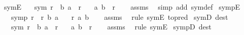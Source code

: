 \begin{isabellebody}
\ symE{\isacharcolon}{\kern0pt}\isanewline
\ \ \ {\isachardoublequoteopen}sym\ r{\isachardoublequoteclose}\ \ {\isachardoublequoteopen}{\isacharparenleft}{\kern0pt}b{\isacharcomma}{\kern0pt}\ a{\isacharparenright}{\kern0pt}\ {\isasymin}\ r{\isachardoublequoteclose}\isanewline
\ \ \ {\isachardoublequoteopen}{\isacharparenleft}{\kern0pt}a{\isacharcomma}{\kern0pt}\ b{\isacharparenright}{\kern0pt}\ {\isasymin}\ r{\isachardoublequoteclose}\isanewline
%
\isadelimproof
\ \ %
\endisadelimproof
%
\isatagproof
{}\isamarkupfalse%
\ assms\ \isamarkupfalse%
\ {\isacharparenleft}{\kern0pt}simp\ add{\isacharcolon}{\kern0pt}\ sym{\isacharunderscore}{\kern0pt}def{\isacharparenright}{\kern0pt}%
\endisatagproof
{\isafoldproof}%
%
\isadelimproof
\isanewline
%
\endisadelimproof
\isanewline
{}\isamarkupfalse%
\ sympE{\isacharcolon}{\kern0pt}\isanewline
\ \ \ {\isachardoublequoteopen}symp\ r{\isachardoublequoteclose}\ \ {\isachardoublequoteopen}r\ b\ a{\isachardoublequoteclose}\isanewline
\ \ \ {\isachardoublequoteopen}r\ a\ b{\isachardoublequoteclose}\isanewline
%
\isadelimproof
\ \ %
\endisadelimproof
%
\isatagproof
{}\isamarkupfalse%
\ assms\ \isamarkupfalse%
\ {\isacharparenleft}{\kern0pt}rule\ symE\ {\isacharbrackleft}{\kern0pt}to{\isacharunderscore}{\kern0pt}pred{\isacharbrackright}{\kern0pt}{\isacharparenright}{\kern0pt}%
\endisatagproof
{\isafoldproof}%
%
\isadelimproof
\isanewline
%
\endisadelimproof
\isanewline
{}\isamarkupfalse%
\ symD\ {\isacharbrackleft}{\kern0pt}dest{\isacharquery}{\kern0pt}{\isacharbrackright}{\kern0pt}{\isacharcolon}{\kern0pt}\isanewline
\ \ \ {\isachardoublequoteopen}sym\ r{\isachardoublequoteclose}\ \ {\isachardoublequoteopen}{\isacharparenleft}{\kern0pt}b{\isacharcomma}{\kern0pt}\ a{\isacharparenright}{\kern0pt}\ {\isasymin}\ r{\isachardoublequoteclose}\isanewline
\ \ \ {\isachardoublequoteopen}{\isacharparenleft}{\kern0pt}a{\isacharcomma}{\kern0pt}\ b{\isacharparenright}{\kern0pt}\ {\isasymin}\ r{\isachardoublequoteclose}\isanewline
%
\isadelimproof
\ \ %
\endisadelimproof
%
\isatagproof
{}\isamarkupfalse%
\ assms\ \isamarkupfalse%
\ {\isacharparenleft}{\kern0pt}rule\ symE{\isacharparenright}{\kern0pt}%
\endisatagproof
{\isafoldproof}%
%
\isadelimproof
\isanewline
%
\endisadelimproof
\isanewline
{}\isamarkupfalse%
\ sympD\ {\isacharbrackleft}{\kern0pt}dest{\isacharquery}{\kern0pt}{\isacharbrackright}{\kern0pt}{\isacharcolon}{\kern0pt}\isanewline

\end{isabellebody}
